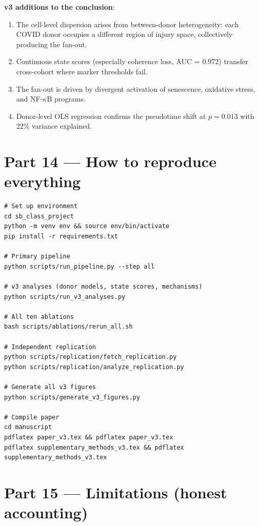 \documentclass[11pt]{article}
\begin{document}
\begin{vnewbox}
\textbf{v3 additions to the conclusion}:
\begin{enumerate}
\item The cell-level dispersion arises from between-donor heterogeneity: each COVID donor occupies a different region of injury space, collectively producing the fan-out.
\item Continuous state scores (especially coherence loss, AUC = 0.972) transfer cross-cohort where marker thresholds fail.
\item The fan-out is driven by divergent activation of senescence, oxidative stress, and NF-$\kappa$B programs.
\item Donor-level OLS regression confirms the pseudotime shift at $p = 0.013$ with 22\% variance explained.
\end{enumerate}
\end{vnewbox}


\section{Part 14 --- How to reproduce everything}

\begin{verbatim}
# Set up environment
cd sb_class_project
python -m venv env && source env/bin/activate
pip install -r requirements.txt

# Primary pipeline
python scripts/run_pipeline.py --step all

# v3 analyses (donor models, state scores, mechanisms)
python scripts/run_v3_analyses.py

# All ten ablations
bash scripts/ablations/rerun_all.sh

# Independent replication
python scripts/replication/fetch_replication.py
python scripts/replication/analyze_replication.py

# Generate all v3 figures
python scripts/generate_v3_figures.py

# Compile paper
cd manuscript
pdflatex paper_v3.tex && pdflatex paper_v3.tex
pdflatex supplementary_methods_v3.tex && pdflatex supplementary_methods_v3.tex
\end{verbatim}


\section{Part 15 --- Limitations (honest accounting)}
\end{document}
